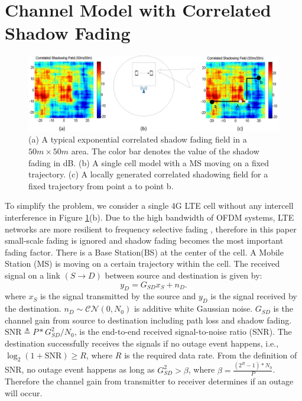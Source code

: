 \section{Channel Model with Correlated Shadow Fading}
\label{sec:shadowing}
\begin{figure}
\centering
\includegraphics[width=14cm]{finalsystemab_V3.eps}
\caption{(a) A typical exponential correlated shadow fading field in a $50m\times50m$ area. The color bar denotes the value of the shadow fading in dB. (b) A single cell model with a MS moving on a fixed trajectory. (c) A locally generated correlated shadowing field for a fixed trajectory from point a to point b.}
\label{systemmodel}
\end{figure}
To simplify the problem, we consider a single 4G LTE cell without any intercell interference in Figure \ref{systemmodel}(b). Due to the high bandwidth of OFDM systems,  LTE networks are more resilient to frequency selective fading \cite{rappaport1996wireless}, therefore in this paper small-scale fading is ignored and shadow fading becomes the most important fading factor. There is a Base Station(BS) at the center of the cell. A Mobile Station (MS) is moving on a certain trajectory within the cell. The received signal on a link $(S\to D)$ between source and destination is given by:
\begin{equation}
y_{D} = G_{SD}x_{S}+n_{D}.
\end{equation}
where $x_{S}$ is the signal transmitted by the source and $y_{D}$ is the signal received by the destination. $n_{D}\sim \mathcal{CN}(0,N_{0})$ is additive white Gaussian noise. $G_{SD}$ is the channel gain from source to destination including path loss and shadow fading.  $\text{SNR} \triangleq P*G_{SD}^{2}/N_{0}$, is the end-to-end received signal-to-noise ratio (SNR). The destination successfully receives the signals if no outage event happens, i.e., $\log_{2}(1+\text{SNR})\ge R$, where $R$ is the required data rate. From the definition of SNR, no outage event happens as long as $G_{SD}^2 > \beta$, where $\beta = \frac{(2^{R}-1)*N_{0}}{P}$. Therefore the channel gain from transmitter to receiver determines if an outage will occur.
